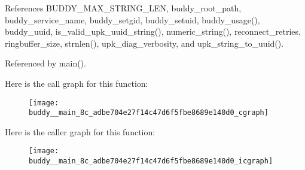 References BUDDY\_\-MAX\_\-STRING\_\-LEN, buddy\_\-root\_\-path, buddy\_\-service\_\-name, buddy\_\-setgid, buddy\_\-setuid, buddy\_\-usage(), buddy\_\-uuid, is\_\-valid\_\-upk\_\-uuid\_\-string(), numeric\_\-string(), reconnect\_\-retries, ringbuffer\_\-size, strnlen(), upk\_\-diag\_\-verbosity, and upk\_\-string\_\-to\_\-uuid().



Referenced by main().



Here is the call graph for this function:
\nopagebreak
\begin{figure}[H]
\begin{center}
\leavevmode
\texttt{[image: buddy\_\_main\_8c\_adbe704e27f14c47d6f5fbe8689e140d0\_cgraph]}
\end{center}
\end{figure}




Here is the caller graph for this function:\nopagebreak
\begin{figure}[H]
\begin{center}
\leavevmode
\texttt{[image: buddy\_\_main\_8c\_adbe704e27f14c47d6f5fbe8689e140d0\_icgraph]}
\end{center}
\end{figure}


